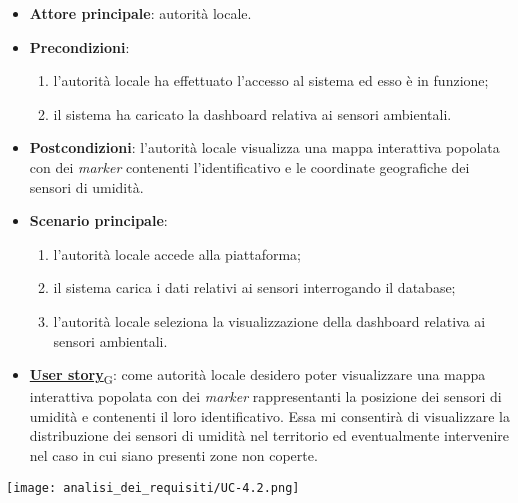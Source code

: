 \begin{itemize}
	\item \textbf{Attore principale}: autorità locale.
	\item \textbf{Precondizioni}:
	      \begin{enumerate}
		      \item l'autorità locale ha effettuato l'accesso al sistema ed esso è in funzione;
		      \item il sistema ha caricato la dashboard relativa ai sensori ambientali.
	      \end{enumerate}
	\item \textbf{Postcondizioni}: l'autorità locale visualizza una mappa interattiva popolata con dei \textit{marker} contenenti l'identificativo e le coordinate geografiche dei sensori di umidità.
	\item \textbf{Scenario principale}:
	      \begin{enumerate}
		      \item l'autorità locale accede alla piattaforma;
		      \item il sistema carica i dati relativi ai sensori interrogando il database;
		      \item l'autorità locale seleziona la visualizzazione della dashboard relativa ai sensori ambientali.
	      \end{enumerate}
	\item \href{https://7last.github.io/docs/pb/documentazione-interna/glossario\#user-story}{\textbf{User story}\textsubscript{G}}:
	      come autorità locale desidero poter visualizzare una mappa interattiva popolata con dei \textit{marker} rappresentanti la posizione dei sensori di umidità
	      e contenenti il loro identificativo. Essa mi consentirà di visualizzare la distribuzione dei sensori di umidità nel territorio ed eventualmente intervenire nel caso in cui siano presenti zone non coperte.
\end{itemize}
\begin{center}
	\texttt{[image: analisi\_dei\_requisiti/UC-4.2.png]}
\end{center}


